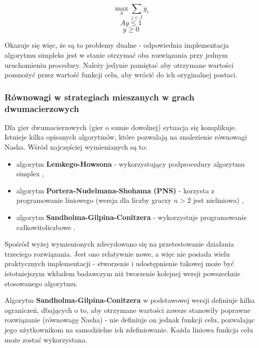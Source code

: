 \documentclass[polish]{standalone}
\begin{document}
$$\max_y \sum_{j \in J} y_i$$
$$Ay \leq 1$$
$$y \geq 0$$

Okazuje się więc, że są to problemy dualne - odpowiednia implementacja algorytmu simpleks jest w stanie otrzymać oba
rozwiązania przy jednym uruchomieniu procedury. Należy jedynie pamiętać aby otrzymane wartości pomnożyć przez wartość
funkcji celu, aby wrócić do ich oryginalnej postaci.

\subsubsection{Równowagi w strategiach mieszanych w grach dwumacierzowych}

Dla gier dwumacierzowych (gier o sumie dowolnej) sytuacja się komplikuje. Istnieje kilka opisanych algorytmów, które
pozwalają na znalezienie równowagi Nasha. Wśród najczęściej wymienianych są to:
\begin{itemize}
\item algorytm \textbf{Lemkego-Howsona} - wykorzystujący podprocedury algorytmu simplex \cite{LH-NE},
\item algorytm \textbf{Portera-Nudelmana-Shohama (PNS)} - korzysta z programowanie liniowego (wersja dla liczby graczy
$n > 2$ jest nieliniowa) \cite{PNS-NE},
\item algorytm \textbf{Sandholma-Gilpina-Conitzera} - wykorzystuje programowanie całkowitoliczbowe \cite{SCG-NE}.
\end{itemize}

Spośród wyżej wymienionych zdecydowano się na przetestowanie działania trzeciego rozwiązania. Jest ono relatywnie nowe,
a więc nie posiada wielu praktycznych implementacji - stworzenie i udostępnienie takowej może być istotniejszym wkładem
badawczym niż tworzenie kolejnej wersji powszechnie stosowanego algorytmu.

Algorytm \textbf{Sandholma-Gilpina-Conitzera} w podstawowej wersji definiuje kilka ograniczeń, dbających o to, aby 
otrzymane wartości zawsze stanowiły poprawne rozwiązanie (równowagę Nasha) - nie definiuje on jednak funkcji celu,
pozwalając jego użytkownikom na samodzielne ich zdefiniowanie. Każda liniowa funkcja celu może zostać wykorzystana.
\end{document}
